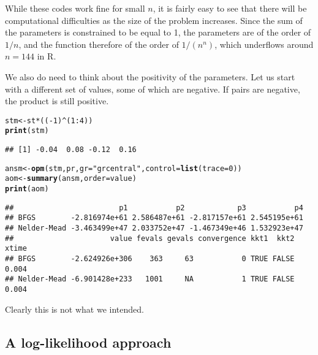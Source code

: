 \documentclass[11pt]{article}\usepackage[]{graphicx}\usepackage[]{color}
\makeatletter
\newcommand{\hlnum}[1]{\textcolor[rgb]{0.686,0.059,0.569}{#1}}%
\newcommand{\hlstr}[1]{\textcolor[rgb]{0.192,0.494,0.8}{#1}}%
\newcommand{\hlopt}[1]{\textcolor[rgb]{0,0,0}{#1}}%
\newcommand{\hlstd}[1]{\textcolor[rgb]{0.345,0.345,0.345}{#1}}%
\newcommand{\hlkwb}[1]{\textcolor[rgb]{0.69,0.353,0.396}{#1}}%
\newcommand{\hlkwc}[1]{\textcolor[rgb]{0.333,0.667,0.333}{#1}}%
\newcommand{\hlkwd}[1]{\textcolor[rgb]{0.737,0.353,0.396}{\textbf{#1}}}%
\newenvironment{kframe}{%
 \def\at@end@of@kframe{}%
 \ifinner\ifhmode%
  \def\at@end@of@kframe{\end{minipage}}%
  \begin{minipage}{\columnwidth}%
 \fi\fi%
 \def\FrameCommand##1{\hskip\@totalleftmargin \hskip-\fboxsep
 \colorbox{shadecolor}{##1}\hskip-\fboxsep
     \hskip-\linewidth \hskip-\@totalleftmargin \hskip\columnwidth}%
 \MakeFramed {\advance\hsize-\width
   \@totalleftmargin\z@ \linewidth\hsize
   \@setminipage}}%
 {\par\unskip\endMakeFramed%
 \at@end@of@kframe}
\newenvironment{knitrout}{}{} %
\newcommand{\R}{{\sf R}}
\makeatother
\begin{document}
While these codes work fine for small $n$, it is fairly easy to see that there will be 
computational difficulties as the size of the problem increases. Since the sum of the 
parameters is constrained to be equal to 1, the parameters are of the order of $1/n$,
and the function therefore of the order of $1/(n^n)$, which underflows around $n=144$ in 
\R. 

We also do need to think about the positivity of the parameters. Let us start with 
a different set of values, some of which are negative. If pairs are negative, the 
product is still positive.

\begin{knitrout}\scriptsize
{}\color{fgcolor}\begin{kframe}
\begin{alltt}
\hlstd{stm} \hlkwb{<-} \hlstd{st}\hlopt{*}\hlstd{((}\hlopt{-}\hlnum{1}\hlstd{)}\hlopt{^}\hlstd{(}\hlnum{1}\hlopt{:}\hlnum{4}\hlstd{))}
\hlkwd{print}\hlstd{(stm)}
\end{alltt}
\begin{verbatim}
## [1] -0.04  0.08 -0.12  0.16
\end{verbatim}
\begin{alltt}
\hlstd{ansm}\hlkwb{<-}\hlkwd{opm}\hlstd{(stm, pr,} \hlkwc{gr}\hlstd{=}\hlstr{"grcentral"}\hlstd{,} \hlkwc{control}\hlstd{=}\hlkwd{list}\hlstd{(}\hlkwc{trace}\hlstd{=}\hlnum{0}\hlstd{))}
\hlstd{aom} \hlkwb{<-} \hlkwd{summary}\hlstd{(ansm,} \hlkwc{order}\hlstd{=value)}
\hlkwd{print}\hlstd{(aom)}
\end{alltt}
\begin{verbatim}
##                        p1           p2            p3           p4
## BFGS        -2.816974e+61 2.586487e+61 -2.817157e+61 2.545195e+61
## Nelder-Mead -3.463499e+47 2.033752e+47 -1.467349e+46 1.532923e+47
##                      value fevals gevals convergence kkt1  kkt2 xtime
## BFGS        -2.624926e+306    363     63           0 TRUE FALSE 0.004
## Nelder-Mead -6.901428e+233   1001     NA           1 TRUE FALSE 0.004
\end{verbatim}
\end{kframe}
\end{knitrout}

Clearly this is not what we intended.

\subsection{A log-likelihood approach}
\end{document}
